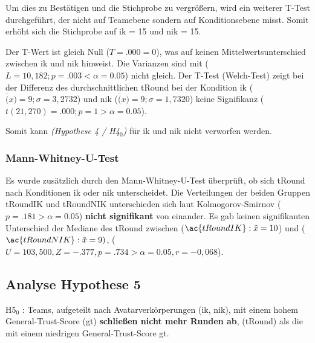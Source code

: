 \documentclass[a4paper,11pt]{article}%
\renewcommand{\\}{\vspace*{0.5\baselineskip} \newline}
\begin{document}
Um dies zu Bestätigen und die Stichprobe zu vergrößern, wird ein weiterer T-Test durchgeführt, der nicht auf Teamebene sondern auf Konditionsebene misst. Somit erhöht sich die Stichprobe auf \ac{ik} = 15 und \ac{nik} = 15.

Der T-Wert ist gleich Null ($T = .000 = 0$), was auf keinen Mittelwertsunterschied zwischen \ac{ik} und \ac{nik} hinweist.
Die Varianzen sind mit ($L= 10,182; p = .003 < \alpha = 0.05$) nicht gleich.
Der T-Test (Welch-Test) zeigt bei der Differenz des durchschnittlichen \ac{tRound} bei der Kondition \ac{ik} ($\bar(x) = 9; \sigma = 3,2732$) und \ac{nik} ($\bar(x) = 9; \sigma = 1,7320$) keine Signifikanz ($t(21,270) = .000; p = 1 > \alpha = 0.05$).

Somit kann \textit{(Hypothese 4 / H4$_{0}$)} für \ac{ik} und \ac{nik} nicht verworfen werden.

\subsubsection{Mann-Whitney-U-Test}
Es wurde zusätzlich durch den Mann-Whitney-U-Test überprüft, ob sich \ac{tRound} nach Konditionen \ac{ik} oder \ac{nik} unterscheidet. Die Verteilungen der beiden Gruppen \ac{tRoundIK} und \ac{tRoundNIK} unterschieden sich laut Kolmogorov-Smirnov ($p = .181 > \alpha = 0.05$) \textbf{nicht signifikant} von einander. Es gab keinen signifikanten Unterschied der Mediane des \ac{tRound} zwischen ($\ac{tRoundIK} : \tilde x = 10$) und ($\ac{tRoundNIK} : \tilde x = 9)$, ($U = 103,500, Z = -.377, p = .734 > \alpha = 0.05, r = -0,068$).

\newpage
	\subsection{Analyse Hypothese 5}
H5$_{0}$ : Teams, aufgeteilt nach Avatarverkörperungen (\ac{ik}, \ac{nik}), mit einem hohem General-Trust-Score (\ac{gt}) \textbf{schließen nicht mehr Runden ab}, (\ac{tRound}) als die mit einem niedrigen General-Trust-Score \ac{gt}.
\end{document}
